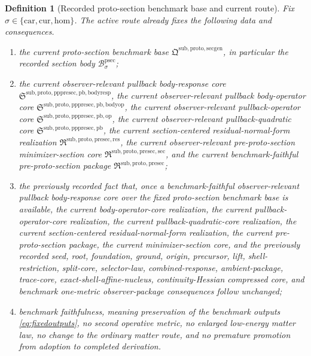 \documentclass[11pt]{article}
\newcommand{\Car}{\mathrm{car}}
\newcommand{\Cur}{\mathrm{cur}}
\newcommand{\Hom}{\mathrm{hom}}
\newcommand{\ProtoSectionPackage}{\mathfrak Q^{\mathrm{sub,proto,secgen}}}
\newcommand{\ProtoSectionBody}[1]{\mathcal B_{#1}^{\mathrm{psec}}}
\newcommand{\PreProtoSectionPackage}{\mathfrak R^{\mathrm{sub,proto,presec}}}
\newcommand{\PreProtoSectionMinSectionCore}{\mathfrak R^{\mathrm{sub,proto,presec,sec}}}
\newcommand{\PreProtoSectionResidualPackage}{\mathfrak R^{\mathrm{sub,proto,presec,res}}}
\newcommand{\PrePreProtoSectionPullbackCore}{\mathfrak S^{\mathrm{sub,proto,pppresec,pb}}}
\newcommand{\PullbackOperatorCore}{\mathfrak S^{\mathrm{sub,proto,pppresec,pb,op}}}
\newcommand{\PullbackBodyOperatorCore}{\mathfrak S^{\mathrm{sub,proto,pppresec,pb,bodyop}}}
\newcommand{\PullbackBodyResponseCore}{\mathfrak S^{\mathrm{sub,proto,pppresec,pb,bodyresp}}}
\newtheorem{definition}{Definition}
\begin{document}
\begin{definition}[Recorded proto-section benchmark base and current route]
\label{def:route}
Fix \(\sigma\in\{\Car,\Cur,\Hom\}\). The active route already fixes the following data and consequences.
\begin{enumerate}
    \item the current proto-section benchmark base \(\ProtoSectionPackage\), in particular the recorded section body \(\ProtoSectionBody{\sigma}\);
    \item the current observer-relevant pullback body-response core \(\PullbackBodyResponseCore\), the current observer-relevant pullback body-operator core \(\PullbackBodyOperatorCore\), the current observer-relevant pullback-operator core \(\PullbackOperatorCore\), the current observer-relevant pullback-quadratic core \(\PrePreProtoSectionPullbackCore\), the current section-centered residual-normal-form realization \(\PreProtoSectionResidualPackage\), the current observer-relevant pre-proto-section minimizer-section core \(\PreProtoSectionMinSectionCore\), and the current benchmark-faithful pre-proto-section package \(\PreProtoSectionPackage\);
    \item the previously recorded fact that, once a benchmark-faithful observer-relevant pullback body-response core over the fixed proto-section benchmark base is available, the current body-operator-core realization, the current pullback-operator-core realization, the current pullback-quadratic-core realization, the current section-centered residual-normal-form realization, the current pre-proto-section package, the current minimizer-section core, and the previously recorded seed, root, foundation, ground, origin, precursor, lift, shell-restriction, split-core, selector-law, combined-response, ambient-package, trace-core, exact-shell-affine-nucleus, continuity-Hessian compressed core, and benchmark one-metric observer-package consequences follow unchanged;
    \item benchmark faithfulness, meaning preservation of the benchmark outputs \eqref{eq:fixedoutputs}, no second operative metric, no enlarged low-energy matter law, no change to the ordinary matter route, and no premature promotion from adoption to completed derivation.
\end{enumerate}
\end{definition}
\end{document}
